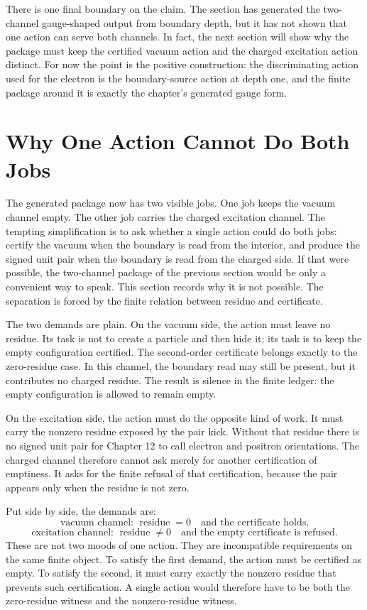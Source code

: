 There is one final boundary on the claim. The section has generated the
two-channel gauge-shaped output from boundary depth, but it has not shown that one
action can serve both channels. In fact, the next section will show why the package
must keep the certified vacuum action and the charged excitation action distinct.
For now the point is the positive construction: the discriminating action used for
the electron is the boundary-source action at depth one, and the finite package
around it is exactly the chapter's generated gauge form.

\section{Why One Action Cannot Do Both Jobs}

The generated package now has two visible jobs. One job keeps the vacuum channel
empty. The other job carries the charged excitation channel. The tempting
simplification is to ask whether a single action could do both jobs: certify the
vacuum when the boundary is read from the interior, and produce the signed unit
pair when the boundary is read from the charged side. If that were possible, the
two-channel package of the previous section would be only a convenient way to
speak. This section records why it is not possible. The separation is forced by
the finite relation between residue and certificate.

The two demands are plain. On the vacuum side, the action must leave no residue.
Its task is not to create a particle and then hide it; its task is to keep the
empty configuration certified. The second-order certificate belongs exactly to
the zero-residue case. In this channel, the boundary read may still be present,
but it contributes no charged residue. The result is silence in the finite
ledger: the empty configuration is allowed to remain empty.

On the excitation side, the action must do the opposite kind of work. It must
carry the nonzero residue exposed by the pair kick. Without that residue there is
no signed unit pair for Chapter 12 to call electron and positron orientations.
The charged channel therefore cannot ask merely for another certification of
emptiness. It asks for the finite refusal of that certification, because the
pair appears only when the residue is not zero.

Put side by side, the demands are:
\[
  \text{vacuum channel: } \operatorname{residue}=0
  \quad\text{and the certificate holds,}
\]
\[
  \text{excitation channel: } \operatorname{residue}\neq 0
  \quad\text{and the empty certificate is refused.}
\]
These are not two moods of one action. They are incompatible requirements on the
same finite object. To satisfy the first demand, the action must be certified as
empty. To satisfy the second, it must carry exactly the nonzero residue that
prevents such certification. A single action would therefore have to be both the
zero-residue witness and the nonzero-residue witness.

